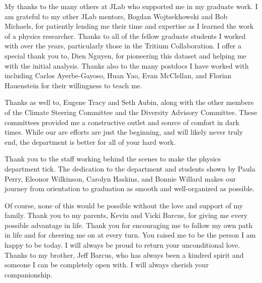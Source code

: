 \documentclass[../main.tex]{subfiles}
\begin{document}
\begin{singlespace}
{{\begin{flushleft}
My thanks to the many others at JLab who supported me in my graduate work. I am grateful to my other JLab mentors, Bogdan Wojtsekhowski and Bob Michaels, for patiently lending me their time and expertise as I learned the work of a physics researcher. Thanks to all of the fellow graduate students I worked with over the years, particularly those in the Tritium Collaboration. I offer a special thank you to, Dien Nguyen, for pioneering this dataset and helping me with the initial analysis. Thanks also to the many postdocs I have worked with including Carlos Ayerbe-Gayoso, Huan Yao, Evan McClellan, and Florian Hauenstein for their willingness to teach me.

\end{flushleft}
} %

{\parindent0pt %
\begin{flushleft}
                                                                                 
Thanks as well to, Eugene Tracy and Seth Aubin, along with the other members of the Climate Steering Committee and the Diversity Advisory Committee. These committees provided me a constructive outlet and source of comfort in dark times. While our are efforts are just the beginning, and will likely never truly end, the department is better for all of your hard work.

\end{flushleft}
} %

{\parindent0pt %
\begin{flushleft}
                                                                                 
Thank you to the staff working behind the scenes to make the physics department tick. The dedication to the department and students shown by Paula Perry, Eleonor Wilkinson, Carolyn Haskins, and Bonnie Willard makes our journey from orientation to graduation as smooth and well-organized as possible. 

\end{flushleft}
} %

{\parindent0pt %
\begin{flushleft}
                                                                                 
Of course, none of this would be possible without the love and support of my family. Thank you to my parents, Kevin and Vicki Barcus, for giving me every possible advantage in life. Thank you for encouraging me to follow my own path in life and for cheering me on at every turn. You raised me to be the person I am happy to be today. I will always be proud to return your unconditional love. Thanks to my brother, Jeff Barcus, who has always been a kindred spirit and someone I can be completely open with. I will always cherish your companionship.                                                                    


\end{flushleft}}}
\end{singlespace}
\end{document}
